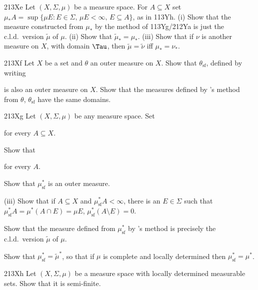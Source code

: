 {\spheader 213Xe Let $(X,\Sigma,\mu)$ be a measure space.   For
$A\subseteq X$ set
$\mu_* A=\sup\{\mu E:E\in\Sigma,\,\mu E<\infty,\,E\subseteq A\}$, as in
113Yh.   (i) Show that the measure constructed from $\mu_*$
by the method of 113Yg/212Ya is just the c.l.d.\ version $\tilde\mu$ of
$\mu$.
(ii) Show that $\tilde\mu_*=\mu_*$.   (iii) Show that if $\nu$ is
another measure
on $X$, with domain $\Tau$, then $\tilde\mu=\tilde\nu$ iff
$\mu_*=\nu_*$.

\spheader 213Xf Let $X$ be a set and $\theta$ an outer measure on $X$.
Show that $\theta_{\text{sf}}$, defined by writing


\noindent is also an outer measure on $X$.   Show that the measures
defined by \Caratheodory's method from $\theta$, $\theta_{\text{sf}}$ have the
same domains.

\spheader 213Xg Let $(X,\Sigma,\mu)$ be any measure space.   Set


\noindent for every $A\subseteq X$.

 Show that


\noindent for every $A$.

 Show that $\mu^*_{\text{sf}}$ is an outer measure.

\quad(iii) Show that if $A\subseteq X$ and $\mu^*_{\text{sf}}A<\infty$, there
is an $E\in\Sigma$ such that $\mu^*_{\text{sf}}A=\mu^*(A\cap E)=\mu E$,
$\mu^*_{\text{sf}}(A\setminus E)=0$.   

 Show that the measure defined from $\mu^*_{\text{sf}}$ by
\Caratheodory's method is precisely the c.l.d.\ version $\tilde\mu$ of
$\mu$.

 Show that $\mu^*_{\text{sf}}=\tilde\mu^*$, so that if $\mu$ is
complete and locally determined then $\mu^*_{\text{sf}}=\mu^*$.

\sqheader 213Xh Let $(X,\Sigma,\mu)$ be a measure space
with locally determined measurable sets.   Show that it is semi-finite.

}
